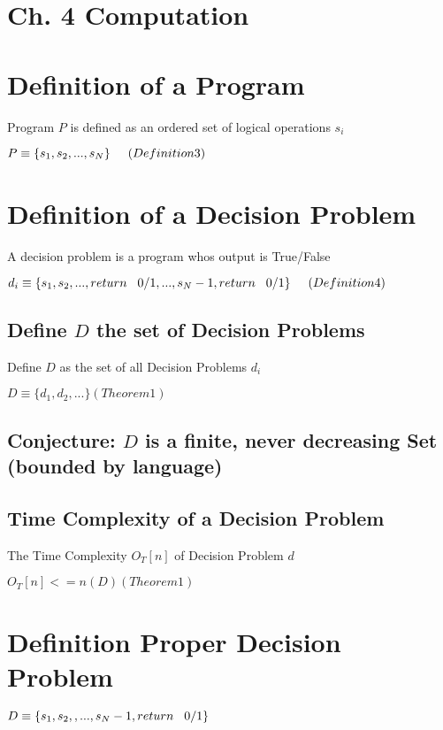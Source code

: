 \documentclass[11pt]{article}
\begin{document}
\section*{Ch. 4 Computation}

\section{Definition of a Program}
Program $P$ is defined as an ordered set of logical operations $s_i$
\begin{center}
$
P \equiv \{ s_1,s_2,...,s_N \} \hspace{5mm} (Definition 3)
$
\end{center}

\section{Definition of a Decision Problem}
A decision problem is a program whos output is True/False
\begin{center}
$
d_i \equiv \{s_1,s_2,..., return \hspace{3mm} 0/1,...,s_N-1,return \hspace{3mm} 0/1\} \hspace{5mm} (Definition 4)
$
\end{center}
\subsection{Define $D$ the set of Decision Problems}
Define $D$ as the set of all Decision Problems $d_i$
\begin{center}
$
D \equiv \{d_1,d_2,...\}(Theorem 1)
$
\end{center}

\subsection{Conjecture: $D$ is a finite, never decreasing Set (bounded by language)}


\subsection{Time Complexity of a Decision Problem}
The Time Complexity $O_T [n]$ of Decision Problem $d$
\begin{center}
$
O_T[n] <= n(D) (Theorem 1)
$
\end{center}
\section{Definition Proper Decision Problem}
\begin{center}
$
D \equiv \{s_1,s_2,,...,s_N-1,return \hspace{3mm} 0/1\}
$
\end{center}
\end{document}
